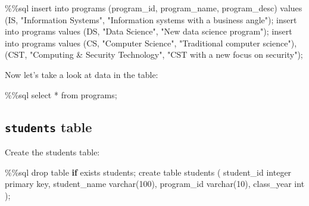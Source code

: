 \documentclass[
  letterpaper,
]{scrbook}
\newenvironment{Shaded}{\begin{snugshade}}{\end{snugshade}}
\newcommand{\BuiltInTok}[1]{\textcolor[rgb]{0.00,0.23,0.31}{#1}}
\newcommand{\ControlFlowTok}[1]{\textcolor[rgb]{0.00,0.23,0.31}{\textbf{#1}}}
\newcommand{\DecValTok}[1]{\textcolor[rgb]{0.68,0.00,0.00}{#1}}
\newcommand{\ImportTok}[1]{\textcolor[rgb]{0.00,0.46,0.62}{#1}}
\newcommand{\NormalTok}[1]{\textcolor[rgb]{0.00,0.23,0.31}{#1}}
\newcommand{\OperatorTok}[1]{\textcolor[rgb]{0.37,0.37,0.37}{#1}}
\newcommand{\StringTok}[1]{\textcolor[rgb]{0.13,0.47,0.30}{#1}}
\begin{document}
\begin{Shaded}
\begin{Highlighting}[]
\OperatorTok{\%\%}\NormalTok{sql}
\NormalTok{insert into programs (program\_id, program\_name, program\_desc)}
\NormalTok{            values   (}\StringTok{\textquotesingle{}IS\textquotesingle{}}\NormalTok{, }\StringTok{"Information Systems"}\NormalTok{, }\StringTok{"Information systems with a business angle"}\NormalTok{)}\OperatorTok{;}
\NormalTok{insert into programs values (}\StringTok{\textquotesingle{}DS\textquotesingle{}}\NormalTok{, }\StringTok{"Data Science"}\NormalTok{, }\StringTok{"New data science program"}\NormalTok{)}\OperatorTok{;}
\NormalTok{insert into programs values }
\NormalTok{        (}\StringTok{\textquotesingle{}CS\textquotesingle{}}\NormalTok{, }\StringTok{"Computer Science"}\NormalTok{, }\StringTok{"Traditional computer science"}\NormalTok{),}
\NormalTok{        (}\StringTok{\textquotesingle{}CST\textquotesingle{}}\NormalTok{, }\StringTok{"Computing \& Security Technology"}\NormalTok{, }\StringTok{"CST with a new focus on security"}\NormalTok{)}\OperatorTok{;}
\end{Highlighting}
\end{Shaded}

Now let's take a look at data in the table:

\begin{Shaded}
\begin{Highlighting}[]
\OperatorTok{\%\%}\NormalTok{sql}
\NormalTok{select }\OperatorTok{*} \ImportTok{from}\NormalTok{ programs}\OperatorTok{;}
\end{Highlighting}
\end{Shaded}

\subsection*{\texorpdfstring{\texttt{students}
table}{students table}}\label{students-table}

Create the students table:

\begin{Shaded}
\begin{Highlighting}[]
\OperatorTok{\%\%}\NormalTok{sql}
\NormalTok{drop table }\ControlFlowTok{if}\NormalTok{ exists students}\OperatorTok{;}
\NormalTok{create table students (}
\NormalTok{    student\_id integer primary key, }
\NormalTok{    student\_name varchar(}\DecValTok{100}\NormalTok{), }
\NormalTok{    program\_id varchar(}\DecValTok{10}\NormalTok{),}
\NormalTok{    class\_year }\BuiltInTok{int}
\NormalTok{)}\OperatorTok{;}
\end{Highlighting}
\end{Shaded}
\end{document}
